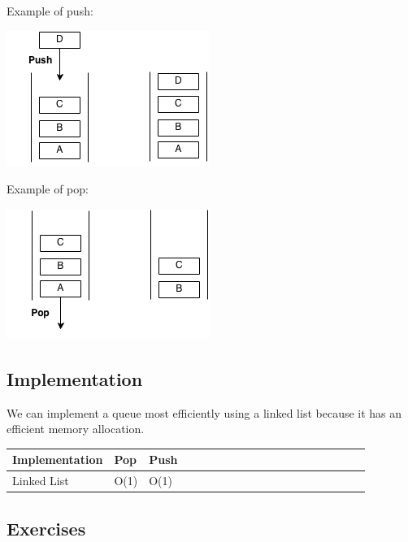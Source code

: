 \documentclass[11pt,oneside]{book}
\makeatletter
\def\maxwidth#1{\ifdim\Gin@nat@width>#1 #1\else\Gin@nat@width\fi}
\makeatother
\begin{document}
Example of push:

\includegraphics[width=\maxwidth{\textwidth}]{queue.png}

Example of pop:

\includegraphics[width=\maxwidth{\textwidth}]{queue2.png}

\subsection{Implementation}

We can implement a queue most efficiently using a linked list because it has an efficient memory allocation.

\vspace{10pt} \begin{tabular}{|l|l|l|l|l|l|l|l|l|l|l|l|l|l|l|l|l|l|l}\hline


  Implementation &
  Pop &
  Push\\
\hline


  Linked List &
  O(1) &
  O(1)\\

\hline\end{tabular}

\subsection{Exercises}
\end{document}
